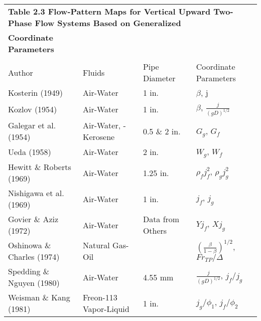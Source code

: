 \documentclass[12pt,fleqn]{report}
\begin{document}
{\newpage
\clearpage
\samepage \begin{sidewaystable}[hp]
\begin{minipage}{9.0in}

\begin{tabular}{*{4}{l}}
\multicolumn{4}{l}{\bf Table 2.3  Flow-Pattern Maps for Vertical Upward Two-Phase Flow Systems Based on Generalized} \\ 
\hspace{18mm} \bf {Coordinate Parameters} &   &   &   \\  [5mm] \hline
  &  &  &  \\ 
Author & Fluids & Pipe Diameter & Coordinate Parameters\\  [5mm] \hline
Kosterin (1949) & Air-Water & 1 in. & $\beta$, j\\ 
Kozlov (1954) & Air-Water & 1 in. & $\beta$, $\frac{j}{ \left( gD \right)^{1/2}}$\\ 
Galegar et al. (1954) & Air-Water, -Kerosene & 0.5 \& 2 in. & $G_{g}$, $G_{f}$\\ 
Ueda (1958) & Air-Water & 2 in. & $W_{g}$, $W_{f}$\\ 
Hewitt \& Roberts (1969) & Air-Water & 1.25 in. & $\rho_{f} j_{f}^2$,
$\rho_{g} j_{g}^2$ \\ 
Nishigawa et al. (1969) & Air-Water & 1 in. & $j_{f}$, $j_{g}$\\ 
Govier \& Aziz (1972) & Air-Water & Data from Others & $Yj_{f}$,
$Xj_{g}$ \\ 
Oshinowa \& Charles (1974) & Natural Gas-Oil &  & $\left(
\frac{\beta}{1-\beta} \right)^{1/2}$, $Fr_{TP}/\Delta$\\ 
Spedding \& Nguyen (1980) & Air-Water & 4.55 mm & $\frac{j}{ \left( gD \right)^{1/2}}$, $j_{f}/j_{g}$\\ 
Weisman \& Kang (1981) & Freon-113 Vapor-Liquid & 1 in. &
$j_{g}/\phi_{1}$, $j_{f}/\phi_{2}$ \\  \hline

\end{tabular}

\end{minipage}
\end{sidewaystable}
}
\end{document}
